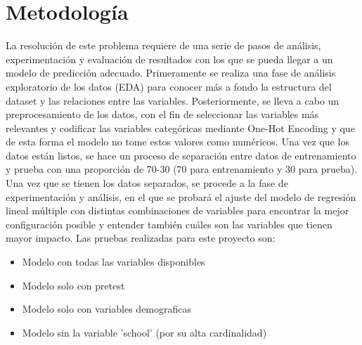 \documentclass[12pt,letterpaper]{article}
\begin{document}
\section{Metodología}
La resolución de este problema requiere de una serie de pasos de análisis, experimentación y evaluación de resultados con los que se pueda llegar a un modelo de predicción adecuado. Primeramente se realiza una fase de análisis exploratorio de los datos (EDA) para conocer más a fondo la estructura del dataset y las relaciones entre las variables. Posteriormente, se lleva a cabo un preprocesamiento de los datos, con el fin de seleccionar las variables más relevantes y codificar las variables categóricas mediante One-Hot Encoding y que de esta forma el modelo no tome estos valores como numéricos. Una vez que los datos están listos, se hace un proceso de separación entre datos de entrenamiento y prueba con una proporción de 70-30 (70 para entrenamiento y 30 para prueba). Una vez que se tienen los datos separados, se procede a la fase de experimentación y análisis, en el que se probará el ajuste del modelo de regresión lineal múltiple con distintas combinaciones de variables para encontrar la mejor configuración posible y entender también cuáles son las variables que tienen mayor impacto. Las pruebas realizadas para este proyecto son:
\begin{itemize}
    \item Modelo con todas las variables disponibles
    \item Modelo solo con pretest
    \item Modelo solo con variables demograficas
    \item Modelo sin la variable 'school' (por su alta cardinalidad)
\end{itemize}

\end{document}
